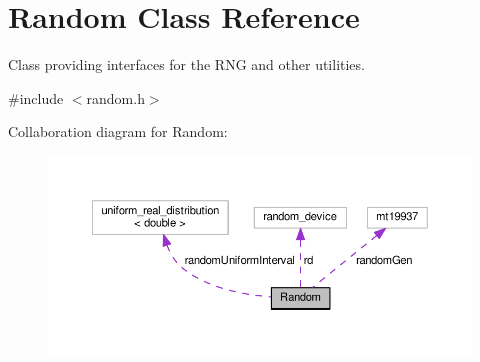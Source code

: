\hypertarget{classRandom}{}\section{Random Class Reference}
\label{classRandom}


Class providing interfaces for the R\+NG and other utilities.  




{\ttfamily \#include $<$random.\+h$>$}



Collaboration diagram for Random\+:\nopagebreak
\begin{figure}[H]
\begin{center}
\leavevmode
\includegraphics[width=350pt]{dc/d73/classRandom__coll__graph}
\end{center}
\end{figure}

